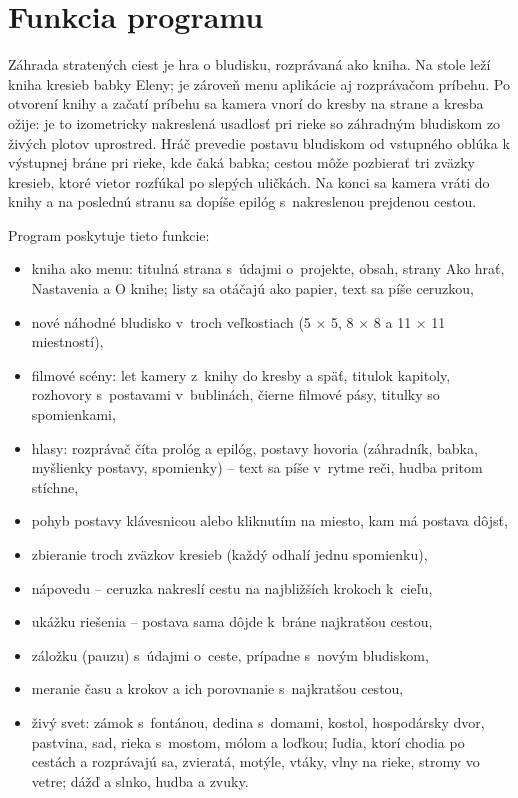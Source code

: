 \documentclass[11pt, a4paper]{article}
\begin{document}
\titulnastrana
\obsah

\section{Funkcia programu}

Záhrada stratených ciest je hra o bludisku, rozprávaná ako kniha. Na stole leží kniha kresieb
babky Eleny; je zároveň menu aplikácie aj rozprávačom príbehu. Po otvorení knihy a začatí
príbehu sa kamera vnorí do kresby na strane a kresba ožije: je to izometricky nakreslená
usadlosť pri rieke so záhradným bludiskom zo živých plotov uprostred. Hráč prevedie postavu
bludiskom od vstupného oblúka k výstupnej bráne pri rieke, kde čaká babka; cestou môže
pozbierať tri zväzky kresieb, ktoré vietor rozfúkal po slepých uličkách. Na konci sa kamera
vráti do knihy a na poslednú stranu sa dopíše epilóg s~nakreslenou prejdenou cestou.

Program poskytuje tieto funkcie:
\begin{itemize}
  \item kniha ako menu: titulná strana s~údajmi o~projekte, obsah, strany Ako hrať, Nastavenia
    a O knihe; listy sa otáčajú ako papier, text sa píše ceruzkou,
  \item nové náhodné bludisko v~troch veľkostiach (5 × 5, 8 × 8 a 11 × 11 miestností),
  \item filmové scény: let kamery z~knihy do kresby a späť, titulok kapitoly, rozhovory
    s~postavami v~bublinách, čierne filmové pásy, titulky so spomienkami,
  \item hlasy: rozprávač číta prológ a epilóg, postavy hovoria (záhradník, babka, myšlienky
    postavy, spomienky) – text sa píše v~rytme reči, hudba pritom stíchne,
  \item pohyb postavy klávesnicou alebo kliknutím na miesto, kam má postava dôjsť,
  \item zbieranie troch zväzkov kresieb (každý odhalí jednu spomienku),
  \item nápovedu – ceruzka nakreslí cestu na najbližších krokoch k~cieľu,
  \item ukážku riešenia – postava sama dôjde k~bráne najkratšou cestou,
  \item záložku (pauzu) s~údajmi o~ceste, prípadne s~novým bludiskom,
  \item meranie času a krokov a ich porovnanie s~najkratšou cestou,
  \item živý svet: zámok s~fontánou, dedina s~domami, kostol, hospodársky dvor, pastvina, sad,
    rieka s~mostom, mólom a loďkou; ľudia, ktorí chodia po cestách a rozprávajú sa, zvieratá,
    motýle, vtáky, vlny na rieke, stromy vo vetre; dážď a slnko, hudba a zvuky.
\end{itemize}
\end{document}
